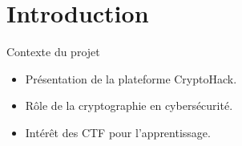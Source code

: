 
\section{Introduction}

\begin{frame}{Contexte du projet}
    \begin{itemize}
        \item Présentation de la plateforme CryptoHack.
        \item Rôle de la cryptographie en cybersécurité.
        \item Intérêt des CTF pour l'apprentissage.
    \end{itemize}
\end{frame}